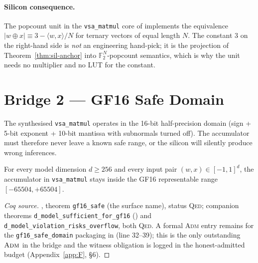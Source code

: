 \paragraph{Silicon consequence.}
The popcount unit in the \texttt{vsa\_matmul} core of
implements the equivalence $|w\oplus x| \equiv 3 - \langle w,x\rangle/N$
for ternary vectors of equal length $N$.
The constant $3$ on the right-hand side is \emph{not} an engineering
hand-pick; it is the projection of Theorem~\ref{thm:sil-anchor} into
$\mathbb{F}_2^N$-popcount semantics, which is why the unit needs no
multiplier and no LUT for the constant.

\section{Bridge 2 --- GF16 Safe Domain}

The synthesised \texttt{vsa\_matmul} operates in the 16-bit half-precision
domain (sign + 5-bit exponent + 10-bit mantissa with subnormals turned off).
The accumulator must therefore never leave a known safe range, or the
silicon will silently produce wrong inferences.

\begin{theorem}
\label{thm:gf16-safe}
For every model dimension $d \geq 256$ and every input pair $(w,x) \in [-1,1]^d$,
the accumulator in \texttt{vsa\_matmul} stays inside the GF16 representable
range $[-65504, +65504]$.
\end{theorem}
\begin{proof}[Coq source]
, theorem
\texttt{gf16\_safe} (the surface name), status \textsc{Qed}; companion
theorems \texttt{d\_model\_sufficient\_for\_gf16} ()
and \texttt{d\_model\_violation\_risks\_overflow}, both \textsc{Qed}.
A formal \textsc{Adm} entry remains for the
\texttt{gf16\_safe\_domain} packaging in
 (line 32--39); this
is the only outstanding $\textsc{Adm}$ in the bridge and the witness
obligation is logged in the honest-admitted budget
(Appendix~\ref{app:F}, §6).
\end{proof}


